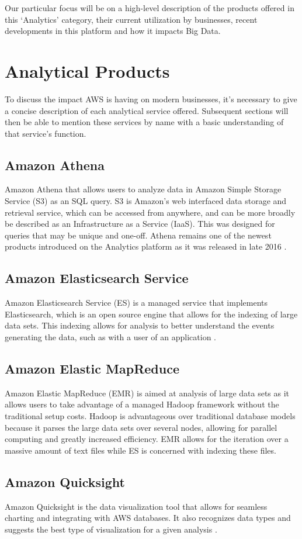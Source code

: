 \documentclass[sigconf]{acmart}
\begin{document}
Our particular focus will be on a high-level description of the products offered in this `Analytics' category, their current utilization by businesses, recent developments in this platform and how it impacts Big Data.

\section{Analytical Products}
To discuss the impact AWS is having on modern businesses, it's necessary to give a concise description of each analytical service offered. Subsequent sections will then be able to mention these services by name with a basic understanding of that service's function. 
\subsection{Amazon Athena}
Amazon Athena that allows users to analyze data in Amazon Simple Storage Service (S3) as an SQL query. S3 is Amazon's web interfaced data storage and retrieval service, which can be accessed from anywhere, and can be more broadly be described as an Infrastructure as a Service (IaaS). This was designed for queries that may be unique and one-off. Athena remains one of the newest products introduced on the Analytics platform as it was released in late 2016 \cite{athena}.
\subsection{Amazon Elasticsearch Service}
Amazon Elasticsearch Service (ES) is a managed service that implements  Elasticsearch, which is an open source engine that allows for the indexing of large data sets. This indexing allows for analysis to better understand the events generating the data, such as with a user of an application \cite{elastic}.
\subsection{Amazon Elastic MapReduce}
Amazon Elastic MapReduce (EMR) is aimed at analysis of large data sets as it allows users to take advantage of a managed Hadoop framework without the traditional setup costs. Hadoop is advantageous over traditional database models because it parses the large data sets over several nodes, allowing for parallel computing and greatly increased efficiency. EMR allows for the iteration over a massive amount of text files while ES is concerned with indexing these files\cite{emr}. 
\subsection{Amazon Quicksight}
Amazon Quicksight is the data visualization tool that allows for seamless charting and integrating with AWS databases. It also recognizes data types and suggests the best type of visualization for a given analysis \cite{quicksight}. 
\end{document}
